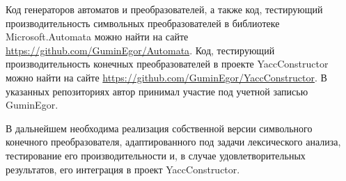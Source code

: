 \documentclass[14pt]{matmex-diploma}
\begin{document}
Код генераторов автоматов и преобразователей, а также код, тестирующий производительность символьных преобразователей в библиотеке Microsoft.Automata можно найти на сайте \url{https://github.com/GuminEgor/Automata}. Код, тестирующий производительность конечных преобразователей в проекте  YaccConstructor можно найти на сайте \url{https://github.com/GuminEgor/YaccConstructor}. В указанных репозиториях автор принимал участие под учетной записью GuminEgor.

В дальнейшем необходима реализация собственной версии символьного конечного преобразователя, адаптированного под задачи лексического анализа, тестирование его производительности и, в случае удовлетворительных результатов, его интеграция в проект YaccConstructor.



\setmonofont[Mapping=tex-text]{CMU Typewriter Text}


\end{document}
